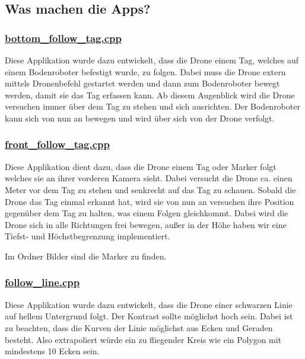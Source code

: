 

\subsection*{Was machen die Apps? }

\subsubsection*{\hyperlink{bottom__follow__tag_8cpp}{bottom\_\-follow\_\-tag.cpp} }

Diese Applikation wurde dazu entwickelt, dass die Drone einem Tag, welches auf einem Bodenroboter befestigt wurde, zu folgen. Dabei muss die Drone extern mittels Dronenbefehl gestartet werden und dann zum Bodenroboter bewegt werden, damit sie das Tag erfassen kann. Ab diesem Augenblick wird die Drone versuchen immer über dem Tag zu stehen und sich ausrichten. Der Bodenroboter kann sich von nun an bewegen und wird über sich von der Drone verfolgt.

\subsubsection*{\hyperlink{front__follow__tag_8cpp}{front\_\-follow\_\-tag.cpp} }

Diese Applikation dient dazu, dass die Drone einem Tag oder Marker folgt welches sie an ihrer vorderen Kamera sieht. Dabei versucht die Drone ca. einen Meter vor dem Tag zu stehen und senkrecht auf das Tag zu schauen. Sobald die Drone das Tag einmal erkannt hat, wird sie von nun an versuchen ihre Position gegenüber dem Tag zu halten, was einem Folgen gleichkommt. Dabei wird die Drone sich in alle Richtungen frei bewegen, außer in der Höhe haben wir eine Tiefst-\/ und Höchstbegrenzung implementiert.

Im Ordner Bilder sind die Marker zu finden.

\subsubsection*{\hyperlink{follow__line_8cpp}{follow\_\-line.cpp} }

Diese Applikation wurde dazu entwickelt, dass die Drone einer schwarzen Linie auf hellem Untergrund folgt. Der Kontrast sollte möglichst hoch sein. Dabei ist zu beachten, dass die Kurven der Linie möglichst aus Ecken und Geraden besteht. Also extrapoliert würde ein zu fliegender Kreis wie ein Polygon mit mindestens 10 Ecken sein.



